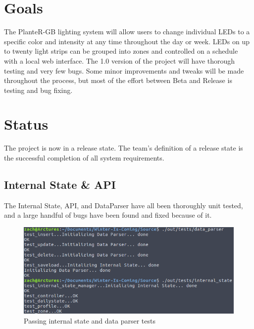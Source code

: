 \documentclass[onecolumn, draftclsnofoot,10pt, compsoc]{IEEEtran}
\begin{document}
	\section{Goals}
	The PlanteR-GB lighting system will allow users to change individual LEDs to a specific color and intensity at any time throughout the day or week.
	LEDs on up to twenty light strips can be grouped into zones and controlled on a schedule with a local web interface.
	The 1.0 version of the project will have thorough testing and very few bugs. Some minor improvements and tweaks will be made throughout the process,
	but most of the effort between Beta and Release is testing and bug fixing.

	\section{Status}
	The project is now in a release state. The team's definition of a release state is the successful completion of all system requirements.
	\\
	\subsection{Internal State \& API}
		The Internal State, API, and DataParser have all been thoroughly unit tested, and a large handful of bugs have been found and fixed because of it.
		\begin{center}
			\begin{figure}[H]
				\includegraphics[width=\linewidth]{tests/internal_state_data_parser_tests.png}
				\caption{Passing internal state and data parser tests}
				\label{fig:isdpTests}
			\end{figure}
		\end{center}
\end{document}
